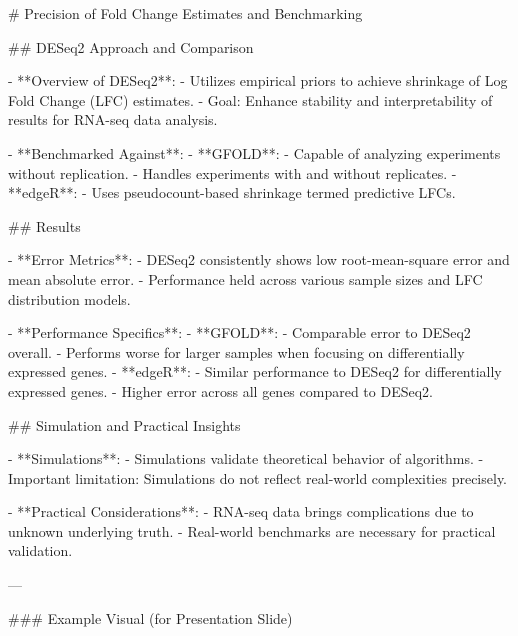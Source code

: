 # Precision of Fold Change Estimates and Benchmarking

## DESeq2 Approach and Comparison

- **Overview of DESeq2**:
  - Utilizes empirical priors to achieve shrinkage of Log Fold Change (LFC) estimates.
  - Goal: Enhance stability and interpretability of results for RNA-seq data analysis.

- **Benchmarked Against**:
  - **GFOLD**:
    - Capable of analyzing experiments without replication.
    - Handles experiments with and without replicates.
  - **edgeR**:
    - Uses pseudocount-based shrinkage termed predictive LFCs.

## Results

- **Error Metrics**:
  - DESeq2 consistently shows low root-mean-square error and mean absolute error.
  - Performance held across various sample sizes and LFC distribution models.

- **Performance Specifics**:
  - **GFOLD**:
    - Comparable error to DESeq2 overall.
    - Performs worse for larger samples when focusing on differentially expressed genes.
  - **edgeR**:
    - Similar performance to DESeq2 for differentially expressed genes.
    - Higher error across all genes compared to DESeq2.

## Simulation and Practical Insights

- **Simulations**:
  - Simulations validate theoretical behavior of algorithms.
  - Important limitation: Simulations do not reflect real-world complexities precisely.

- **Practical Considerations**:
  - RNA-seq data brings complications due to unknown underlying truth.
  - Real-world benchmarks are necessary for practical validation.

---

### Example Visual (for Presentation Slide)

